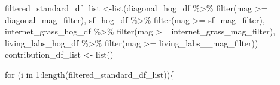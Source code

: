 \documentclass[
  letterpaper,
]{report}
\newenvironment{Shaded}{\begin{snugshade}}{\end{snugshade}}
\newcommand{\ControlFlowTok}[1]{\textcolor[rgb]{0.00,0.23,0.31}{#1}}
\newcommand{\DecValTok}[1]{\textcolor[rgb]{0.68,0.00,0.00}{#1}}
\newcommand{\FunctionTok}[1]{\textcolor[rgb]{0.28,0.35,0.67}{#1}}
\newcommand{\NormalTok}[1]{\textcolor[rgb]{0.00,0.23,0.31}{#1}}
\newcommand{\OtherTok}[1]{\textcolor[rgb]{0.00,0.23,0.31}{#1}}
\newcommand{\SpecialCharTok}[1]{\textcolor[rgb]{0.37,0.37,0.37}{#1}}
\begin{document}
\begin{Shaded}
\begin{Highlighting}[]
\NormalTok{filtered\_standard\_df\_list }\OtherTok{\textless{}{-}}\FunctionTok{list}\NormalTok{(diagonal\_hog\_df }\SpecialCharTok{\%\textgreater{}\%}
                                   \FunctionTok{filter}\NormalTok{(mag }\SpecialCharTok{\textgreater{}=}\NormalTok{ diagonal\_mag\_filter),}
\NormalTok{                                 sf\_hog\_df }\SpecialCharTok{\%\textgreater{}\%}
                                   \FunctionTok{filter}\NormalTok{(mag }\SpecialCharTok{\textgreater{}=}\NormalTok{ sf\_mag\_filter), }
\NormalTok{                                 internet\_grass\_hog\_df }\SpecialCharTok{\%\textgreater{}\%}
                                   \FunctionTok{filter}\NormalTok{(mag }\SpecialCharTok{\textgreater{}=}\NormalTok{ internet\_grass\_mag\_filter), }
\NormalTok{                                 living\_labs\_hog\_df }\SpecialCharTok{\%\textgreater{}\%}
                                   \FunctionTok{filter}\NormalTok{(mag }\SpecialCharTok{\textgreater{}=}\NormalTok{ living\_labs\_\_mag\_filter))}
\NormalTok{contribution\_df\_list }\OtherTok{\textless{}{-}} \FunctionTok{list}\NormalTok{()}

 
\ControlFlowTok{for}\NormalTok{ (i }\ControlFlowTok{in} \DecValTok{1}\SpecialCharTok{:}\FunctionTok{length}\NormalTok{(filtered\_standard\_df\_list))\{}
  

\end{Highlighting}
\end{Shaded}
\end{document}
